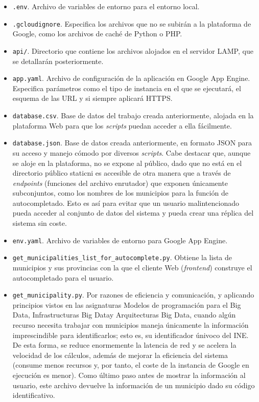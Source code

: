 \begin{itemize}
	\item \texttt{.env}. Archivo de variables de entorno para el entorno local.
	\item \texttt{.gcloudignore}. Especifica los archivos que no se subirán a la plataforma de Google, como los archivos de caché de Python o PHP.
	\item \texttt{api/}. Directorio que contiene los archivos alojados en el servidor LAMP, que se detallarán posteriormente.
	\item \texttt{app.yaml}. Archivo de configuración de la aplicación en Google App Engine. Especifica parámetros como el tipo de instancia en el que se ejecutará, el esquema de las URL y si siempre aplicará HTTPS.
	\item \texttt{database.csv}. Base de datos del trabajo creada anteriormente, alojada en la plataforma Web para que los \textit{scripts} puedan acceder a ella fácilmente.
	\item \texttt{database.json}. Base de datos creada anteriormente, en formato JSON para su acceso y manejo cómodo por diversos \textit{scripts}. Cabe destacar que, aunque se aloje en la plataforma, no se expone al público, dado que no está en el directorio público \guillemotleft static\guillemotright\space ni es accesible de otra manera que a través de \textit{endpoints} (funciones del archivo enrutador) que exponen únicamente subconjuntos, como los nombres de los municipios para la función de autocompletado. Esto es así para evitar que un usuario malintencionado pueda acceder al conjunto de datos del sistema y pueda crear una réplica del sistema sin coste.
	\item \texttt{env.yaml}. Archivo de variables de entorno para Google App Engine.
	\item \texttt{get\_municipalities\_list\_for\_autocomplete.py}. Obtiene la lista de municipios y sus provincias con la que el cliente Web (\textit{frontend}) construye el autocompletado para el usuario.
	\item \texttt{get\_municipality.py}. Por razones de eficiencia y comunicación, y aplicando principios vistos en las asignaturas \guillemotleft Modelos de programación para el Big Data\guillemotright, \guillemotleft Infrastructuras Big Data\guillemotright\space y \guillemotleft Arquitecturas Big Data\guillemotright, cuando algún recurso necesita trabajar con municipios maneja únicamente la información imprescindible para identificarlos; esto es, su identificador únivoco del INE. De esta forma, se reduce enormemente la latencia de red y se acelera la velocidad de los cálculos, además de mejorar la eficiencia del sistema (consume menos recursos y, por tanto, el coste de la instancia de Google en ejecución es menor). Como último paso antes de mostrar la información al usuario, este archivo devuelve la información de un municipio dado su código identificativo.

\end{itemize}
